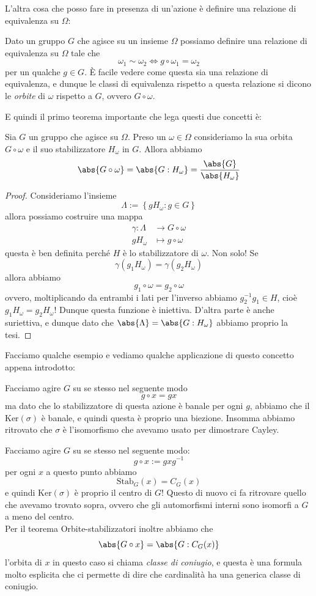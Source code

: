 \documentclass[11pt]{scrartcl}
\renewcommand{\ker}[1]{\text{Ker}\left(#1\right)}
\begin{document}
	L'altra cosa che posso fare in presenza di un'azione è definire una relazione di equivalenza su $\Omega$:
	\begin{definition}[Orbite]
		Dato un gruppo $G$ che agisce su un insieme $\Omega$ possiamo definire una relazione di equivalenza su $\Omega$ tale che
		$$\omega_1\sim \omega_2 \iff g\circ \omega_1=\omega_2$$
		per un qualche $g\in G$. \`E facile vedere come questa sia una relazione di equivalenza, e dunque le classi di equivalenza rispetto a questa relazione si dicono le \textit{orbite} di $\omega$ rispetto a $G$, ovvero $G\circ \omega$.
	\end{definition}
	E quindi il primo teorema importante che lega questi due concetti è:
	\begin{theorem}
		Sia $G$ un gruppo che agisce su $\Omega$. Preso un $\omega\in \Omega$ consideriamo la sua orbita $G\circ \omega$ e il suo stabilizzatore $H_\omega$ in $G$. Allora abbiamo
		$$\abs{G\circ \omega}=\abs{G:H_\omega}=\frac{\abs{G}}{\abs{H_\omega}}$$
	\end{theorem}
	\begin{proof}
		Consideriamo l'insieme 
		$$\Lambda:=\left\{gH_\omega:g\in G\right\}$$
		allora possiamo costruire una mappa
		\begin{align*}
			\gamma: \Lambda & \to G\circ \omega \\
			gH_\omega & \mapsto g\circ \omega
		\end{align*}
		questa è ben definita perché $H$ è lo stabilizzatore di $\omega$. Non solo! Se 
		$$\gamma\left(g_1H_\omega\right)=\gamma\left(g_2H_\omega\right)$$
		allora abbiamo
		$$g_1\circ \omega=g_2\circ \omega$$
		ovvero, moltiplicando da entrambi i lati per l'inverso abbiamo $g_2^{-1} g_1\in H$, cioè $g_1H_\omega=g_2H_\omega$! Dunque questa funzione è iniettiva. D'altra parte è anche suriettiva, e dunque dato che $\abs{\Lambda}=\abs{G:H_\omega}$ abbiamo proprio la tesi.
	\end{proof}
	Facciamo qualche esempio e vediamo qualche applicazione di questo concetto appena introdotto:
	\begin{example}[Cayley]
		Facciamo agire $G$ su se stesso nel seguente modo
		$$g\circ x=gx$$
		ma dato che lo stabilizzatore di questa azione è banale per ogni $g$, abbiamo che il $\ker{\sigma}$ è banale, e quindi questa è proprio una biezione. Insomma abbiamo ritrovato che $\sigma$ è l'isomorfismo che avevamo usato per dimostrare Cayley.
	\end{example}
	\begin{example}
		Facciamo agire $G$ su se stesso nel seguente modo:
		$$g\circ x:= gxg^{-1}$$
		per ogni $x$ a questo punto abbiamo
		$$\text{Stab}_G(x)=C_G(x)$$
		e quindi $\ker{\sigma}$ è proprio il centro di $G$! Questo di nuovo ci fa ritrovare quello che avevamo trovato sopra, ovvero che gli automorfismi interni sono isomorfi a $G$ a meno del centro. \\
		Per il teorema Orbite-stabilizzatori inoltre abbiamo che
		$$\abs{G\circ x}=\abs{G:C_G(x)}$$
		l'orbita di $x$ in questo caso si chiama \textit{classe di coniugio}, e questa è una formula molto esplicita che ci permette di dire che cardinalità ha una generica classe di coniugio.
	\end{example}
\end{document}
